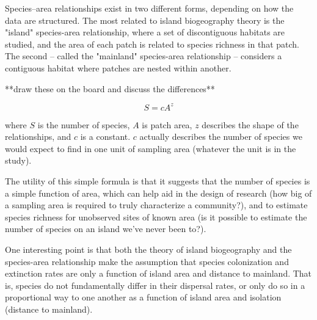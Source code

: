 \documentclass[12pt]{article}
\begin{document}
Species–area relationships exist in two different forms, depending on how the data are structured. The most related to island biogeography theory is the "island" species-area relationship, where a set of discontiguous habitats are studied, and the area of each patch is related to species richness in that patch. The second -- called the "mainland" species-area relationship -- considers a contiguous habitat where patches are nested within another.

**draw these on the board and discuss the differences**



\begin{equation}
S = cA^{z}
\end{equation}


where $S$ is the number of species, $A$ is patch area, $z$ describes the shape of the relationships, and $c$ is a constant. $c$ actually describes the number of species we would expect to find in one unit of sampling area (whatever the unit is in the study).  


The utility of this simple formula is that it suggests that the number of species is a simple function of area, which can help aid in the design of research (how big of a sampling area is required to truly characterize a community?), and to estimate species richness for unobserved sites of known area (is it possible to estimate the number of species on an island we've never been to?). 


One interesting point is that both the theory of island biogeography and the species-area relationship make the assumption that species colonization and extinction rates are only a function of island area and distance to mainland. That is, species do not fundamentally differ in their dispersal rates, or only do so in a proportional way to one another as a function of island area and isolation (distance to mainland). 
\end{document}
